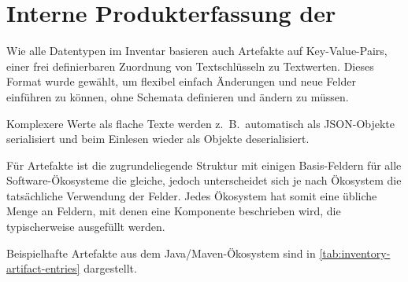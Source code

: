 \section{Interne Produkterfassung der \metaeffektlg}\label{sec:metaeffekt-inventory-format}

Wie alle Datentypen im Inventar basieren auch Artefakte auf Key-Value-Pairs, einer frei definierbaren Zuordnung von Textschlüsseln zu Textwerten.
Dieses Format wurde gewählt, um flexibel einfach Änderungen und neue Felder einführen zu können, ohne Schemata definieren und ändern zu müssen.

Komplexere Werte als flache Texte werden z.\ B.\ automatisch als JSON-Objekte serialisiert und beim Einlesen wieder als Objekte deserialisiert.

Für Artefakte ist die zugrundeliegende Struktur mit einigen Basis-Feldern für alle Software-Ökosysteme die gleiche, jedoch unterscheidet sich je nach Ökosystem die tatsächliche Verwendung der Felder.
Jedes Ökosystem hat somit eine übliche Menge an Feldern, mit denen eine Komponente beschrieben wird, die typischerweise ausgefüllt werden.

Beispielhafte Artefakte aus dem Java/Maven-Ökosystem sind in \autoref{tab:inventory-artifact-entries} dargestellt.

\begin{table}[ht]
    \centering
    \caption{Beispielhafte Artefakteinträge in einem Software-Inventar}
    \label{tab:inventory-artifact-entries}
\end{table}


